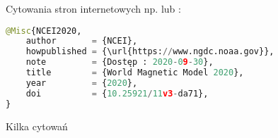 Cytowania stron internetowych np. \citep{NCEI2020} lub \cite{ASGEUPOS2021}:
\begin{lstlisting}[language=Python,	caption={\emph{Cytowania stron internetowych n} }]
@Misc{NCEI2020,
	author       = {NCEI},
	howpublished = {\url{https://www.ngdc.noaa.gov}},
	note         = {Dostęp : 2020-09-30},
	title        = {World Magnetic Model 2020},
	year         = {2020},
	doi          = {10.25921/11v3-da71},
}
\end{lstlisting}

Kilka cytowań \citep{Teunissen.Montenbruck2017,Wanninger1993,Hofmann-Wellenhof.etal2008,NCEI2020,ASGEUPOS2021}
 
